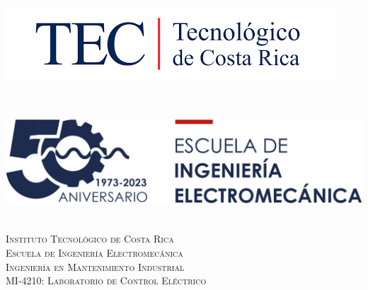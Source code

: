 


\begin{titlepage}
	
	\newcommand{\HRule}{\rule{\linewidth}{0.5mm}} %
	\setlength{\topmargin}{0in}
	\center %
	
	
	\begin{minipage}{0.4\textwidth}
		\begin{flushleft} \large
			\hspace*{-0.5cm}
			\includegraphics[width=1.1\columnwidth]{LOGO_TEC}\\
		\end{flushleft}
	\end{minipage}
	~
	\begin{minipage}{0.5\textwidth}
		\begin{flushright} \large
			\hspace*{2cm}
			\includegraphics[width=0.9\columnwidth]{LOGO_EIE}\\
		\end{flushright}
	\end{minipage}\\[1cm]
	
	\textsc{\LARGE Instituto Tecnol\'{o}gico de Costa Rica}\\[1.5cm] %
	\textsc{\Large Escuela de Ingenier\'ia Electromecánica}\\[1cm] %
	\textsc{\large Ingenier\'ia en Mantenimiento Industrial}\\[1cm] %
	\textsc{\large MI-4210: Laboratorio de Control Eléctrico}\\[0.5cm] %
	

\end{titlepage}
